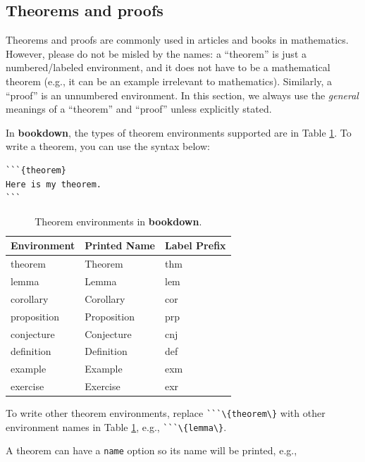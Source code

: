 \documentclass[doctor,openright,twoside]{sjtuthesis}
\newcommand{\passthrough}[1]{#1}
\theoremstyle{plain}
\theoremstyle{definition}
\theoremstyle{remark}
\theoremstyle{ocrenumbox}
\theoremstyle{plain}
\begin{document}
\hypertarget{theorems}{%
\subsection{Theorems and proofs}\label{theorems}}

Theorems and proofs are commonly used in articles and books in mathematics. However, please do not be misled by the names: a ``theorem'' is just a numbered/labeled environment, and it does not have to be a mathematical theorem (e.g., it can be an example irrelevant to mathematics). Similarly, a ``proof'' is an unnumbered environment. In this section, we always use the \emph{general} meanings of a ``theorem'' and ``proof'' unless explicitly stated.

In \textbf{bookdown}, the types of theorem environments supported are in Table \ref{tab:theorem-envs}. To write a theorem, you can use the syntax below:

\begin{lstlisting}
```{theorem}
Here is my theorem.
```
\end{lstlisting}



\begin{table}[t]

\caption{\label{tab:theorem-envs}Theorem environments in \textbf{bookdown}.}
\centering
\begin{tabular}{lll}
\toprule
Environment & Printed Name & Label Prefix\\
\midrule
theorem & Theorem & thm\\
lemma & Lemma & lem\\
corollary & Corollary & cor\\
proposition & Proposition & prp\\
conjecture & Conjecture & cnj\\
\addlinespace
definition & Definition & def\\
example & Example & exm\\
exercise & Exercise & exr\\
\bottomrule
\end{tabular}
\end{table}

To write other theorem environments, replace \passthrough{\lstinline!```\{theorem\}!} with other environment names in Table \ref{tab:theorem-envs}, e.g., \passthrough{\lstinline!```\{lemma\}!}.

A theorem can have a \passthrough{\lstinline!name!} option so its name will be printed, e.g.,
\end{document}
